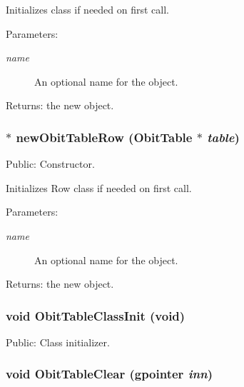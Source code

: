 Initializes class if needed on first call. \begin{Desc}
\item[Parameters:]
\begin{description}
\item[{\em name}]An optional name for the object. \end{description}
\end{Desc}
\begin{Desc}
\item[Returns:]the new object. \end{Desc}
\subsubsection{$\ast$ new\-Obit\-Table\-Row ({\bf Obit\-Table} $\ast$ {\em table})}\label{ObitTable_8c_a13}


Public: Constructor. 

Initializes Row class if needed on first call. \begin{Desc}
\item[Parameters:]
\begin{description}
\item[{\em name}]An optional name for the object. \end{description}
\end{Desc}
\begin{Desc}
\item[Returns:]the new object. \end{Desc}
\subsubsection{\setlength{\rightskip}{0pt plus 5cm}void Obit\-Table\-Class\-Init (void)}\label{ObitTable_8c_a37}


Public: Class initializer. 

\subsubsection{\setlength{\rightskip}{0pt plus 5cm}void Obit\-Table\-Clear (gpointer {\em inn})}\label{ObitTable_8c_a9}


